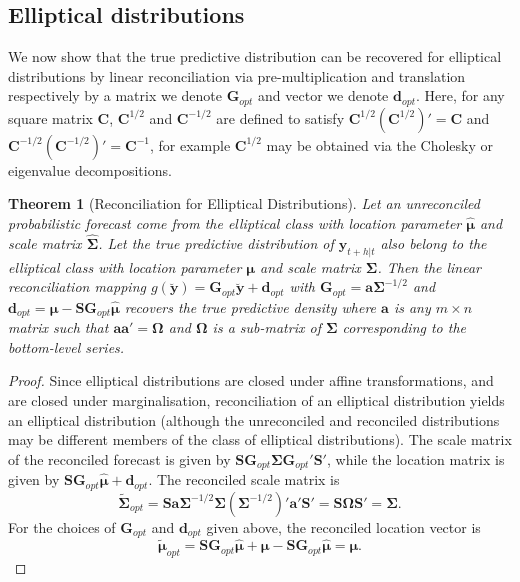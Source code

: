 \documentclass[a4paper, 11pt]{article}
\newtheorem{theo}{Theorem}[section]
\theoremstyle{definition}
\begin{document}
\subsection{Elliptical distributions}

We now show that the true predictive distribution can be recovered for elliptical distributions by linear reconciliation via pre-multiplication and translation respectively by a matrix we denote ${\bm G}_{opt}$ and vector we denote  ${\bm d}_{opt}$. Here, for any square matrix $\bm{C}$, $\bm{C}^{1/2}$ and $\bm{C}^{-1/2}$ are defined to satisfy $\bm{C}^{1/2}(\bm{C}^{1/2})'=\bm{C}$ and $\bm{C}^{-1/2}(\bm{C}^{-1/2})'=\bm{C}^{-1}$, for example $\bm{C}^{1/2}$ may be obtained via the Cholesky or eigenvalue decompositions.

\begin{theo}[Reconciliation for Elliptical Distributions]
	Let an unreconciled probabilistic forecast come from the elliptical class with location parameter $\hat{\bm{\mu}}$ and scale matrix $\hat{\bm{\Sigma}}$. Let the true predictive distribution of $\bm{y}_{t+h|t}$ also belong to the elliptical class with location parameter $\bm{\mu}$ and scale matrix $\bm{\Sigma}$. Then the linear reconciliation mapping $g(\breve{\bm{y}})=\bm{G}_{opt}\breve{\bm{y}}+\bm{d}_{opt}$ with $\bm{G}_{opt}={\bm{a}}{\bm\Sigma}^{-1/2}$ and $\bm{d}_{opt}=\bm{\mu}-\bm{S}\bm{G}_{opt}\hat{\bm{\mu}}$ recovers the true predictive density where ${\bm{a}}$ is any $m\times n$ matrix such that ${\bm{a}}{\bm{a}}'=\bm{\Omega}$ and $\bm{\Omega}$ is a sub-matrix of $\bm{\Sigma}$ corresponding to the bottom-level series.
\end{theo}

\begin{proof}
   Since elliptical distributions are closed under affine transformations, and are closed under marginalisation, reconciliation of an elliptical distribution yields an elliptical distribution (although the unreconciled and reconciled distributions may be different members of the class of elliptical distributions). The scale matrix of the reconciled forecast is given by $\bm{S}\bm{G}_{opt}\bm{\Sigma}\bm{G}_{opt}'\bm{S}'$, while the location matrix is given by $\bm{S}\bm{G}_{opt}\hat{\bm{\mu}}+\bm{d}_{opt}$. The reconciled scale matrix is
   \[
     \tilde{\bm{\Sigma}}_{opt}
       = \bm{S}{\bm{a}}{\bm\Sigma}^{-1/2}\bm{\Sigma}\left({\bm\Sigma}^{-1/2}\right)'{\bm{a}}'\bm{S}'
       = \bm{S}\bm{\Omega}\bm{S}'
       = \bm{\Sigma}.
   \]
   For the choices of $\bm{G}_{opt}$ and $\bm{d}_{opt}$ given above, the reconciled location vector is
   \[
     \tilde{\bm{\mu}}_{opt}= \bm{S}\bm{G}_{opt}\hat{\bm{\mu}}+\bm{\mu}-\bm{S}\bm{G}_{opt}\hat{\bm{\mu}}
   = \bm{\mu}.
   \]
\end{proof}
\end{document}
